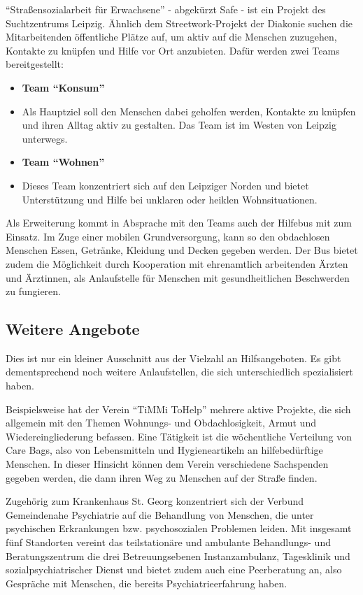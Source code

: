 \enquote{Straßensozialarbeit für Erwachsene} - abgekürzt Safe - ist ein Projekt des Suchtzentrums Leipzig. Ähnlich dem Streetwork-Projekt der Diakonie suchen die Mitarbeitenden öffentliche Plätze auf, um aktiv auf die Menschen zuzugehen, Kontakte zu knüpfen und Hilfe vor Ort anzubieten. Dafür werden zwei Teams bereitgestellt:

\begin{itemize}
	\item \textbf{Team \enquote{Konsum}}
	\item[] Als Hauptziel soll den Menschen dabei geholfen werden, Kontakte zu knüpfen und ihren Alltag aktiv zu gestalten. Das Team ist im Westen von Leipzig unterwegs.
	\item \textbf{Team \enquote{Wohnen}}
	\item[] Dieses Team konzentriert sich auf den Leipziger Norden und bietet Unterstützung und Hilfe bei unklaren oder heiklen Wohnsituationen.
\end{itemize}

Als Erweiterung kommt in Absprache mit den Teams auch der Hilfebus mit zum Einsatz. Im Zuge einer mobilen Grundversorgung, kann so den obdachlosen Menschen Essen, Getränke, Kleidung und Decken gegeben werden. Der Bus bietet zudem die Möglichkeit durch Kooperation mit ehrenamtlich arbeitenden Ärzten und Ärztinnen, als Anlaufstelle für Menschen mit gesundheitlichen Beschwerden zu fungieren. \citep{Safe}

\subsection{Weitere Angebote}

Dies ist nur ein kleiner Ausschnitt aus der Vielzahl an Hilfsangeboten. Es gibt dementsprechend noch weitere Anlaufstellen, die sich unterschiedlich spezialisiert haben.

Beispielsweise hat der Verein \enquote{TiMMi ToHelp} mehrere aktive Projekte, die sich allgemein mit den Themen Wohnungs- und Obdachlosigkeit, Armut und Wiedereingliederung befassen. Eine Tätigkeit ist die wöchentliche Verteilung von Care Bags, also von Lebensmitteln und Hygieneartikeln  an hilfebedürftige Menschen. In dieser Hinsicht können dem Verein verschiedene Sachspenden gegeben werden, die dann ihren Weg zu Menschen auf der Straße finden. \citep{TiMMi}

Zugehörig zum Krankenhaus St. Georg konzentriert sich der Verbund Gemeindenahe Psychiatrie auf die Behandlung von Menschen, die unter psychischen Erkrankungen bzw. psychosozialen Problemen leiden. Mit insgesamt fünf Standorten vereint das teilstationäre und ambulante Behandlungs- und Beratungszentrum die drei Betreuungsebenen Instanzambulanz, Tagesklinik und sozialpsychiatrischer Dienst und bietet zudem auch eine Peerberatung an, also Gespräche mit Menschen, die bereits Psychiatrieerfahrung haben. \citep{VGP}


